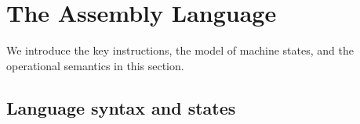\section{The \sparc{} Assembly Language}
\label{sec:modeling}

We introduce the key \sparc{} instructions, the model of machine
states, and the operational semantics in this section.

\subsection{Language syntax and states}
\label{subsec:syntax}
		
		
		
		
		
		
		
